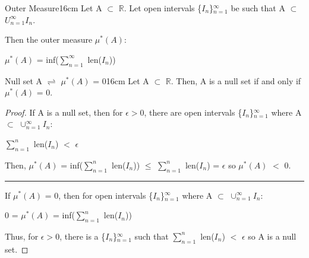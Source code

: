     \vspace{0.5cm}



    \begin{definition}{Outer Measure}{16cm}
        Let A $\subset$ $\mathbb{R}$.
        Let open intervals \{$I_n$\}$_{n=1}^{\infty}$ be such that
        A $\subset$ $U_{n=1}^{\infty} I_n$.

        Then the {\color{lblue} outer measure} $\mu^*(A)$:

        \hspace{0.5cm}
        $\mu^*(A)$
        = inf($\sum_{n=1}^{\infty}$ len($I_n$))
    \end{definition}

    \vspace{0.5cm}



    \begin{wtheorem}{Null set A $\rightleftharpoons$ $\mu^*(A)$ = 0}{16cm}
        Let A $\subset$ $\mathbb{R}$.
        Then, A is a null set if and only if $\mu^*(A)$ = 0.
    \end{wtheorem}

    \begin{proof}
        If A is a null set, then for $\epsilon > 0$, there
        are open intervals \{$I_n$\}$_{n=1}^{\infty}$
        where A $\subset$ $\cup_{n=1}^{\infty} I_n$:

        \hspace{0.5cm}
        $\sum_{n=1}^n$ len($I_n$) $<$ $\epsilon$

        Then, $\mu^*(A)$
        = inf($\sum_{n=1}^n$ len($I_n$))
        $\leq$ $\sum_{n=1}^n$ len($I_n$)
        = $\epsilon$ so $\mu^*(A)$ $<$ 0.

        \rule[0.1cm]{15.2cm}{0.01cm}

        If $\mu^*(A)$ = 0, then
        for open intervals \{$I_n$\}$_{n=1}^{\infty}$
        where A $\subset$ $\cup_{n=1}^{\infty} I_n$:

        \hspace{0.5cm}
        0
        = $\mu^*(A)$
        = inf($\sum_{n=1}^n$ len($I_n$))
        
        Thus, for $\epsilon > 0$, there is a \{$I_n$\}$_{n=1}^{\infty}$ such that
        $\sum_{n=1}^n$ len($I_n$) $<$ $\epsilon$ so A is a null set.
    \end{proof}

    \vspace{0.5cm}



